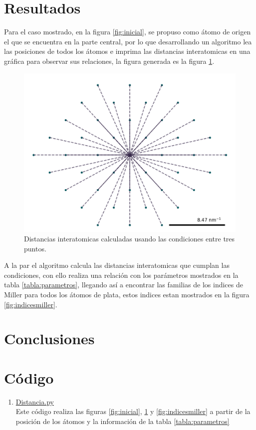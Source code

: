 \documentclass[reprint,amsmath,amssymb,aps,]{revtex4-2}
\begin{document}
\section{Resultados}
Para el caso mostrado, en la figura \ref{fig:inicial}, se propuso como átomo de origen el que se encuentra en la parte central, por lo que
desarrollando un algoritmo lea las posiciones de todos los átomos e imprima las distancias interatomicas en una gráfica para observar sus relaciones,
la figura generada es la figura \ref{fig:distancias}.
\begin{figure}[H]
    \centering
    \includegraphics[scale=0.4]{../Graphics/distancia.png}
    \caption{Distancias interatomicas calculadas usando las condiciones entre tres puntos.}
    \label{fig:distancias}
\end{figure}
A la par el algoritmo calcula las distancias interatomicas que cumplan las condiciones, con ello realiza una relación con los parámetros mostrados en la tabla \ref{tabla:parametros},
llegando así a encontrar las familias de los indices de Miller para todos los átomos de plata, estos indices estan mostrados en la 
figura \ref{fig:indicesmiller}.
\section{Conclusiones}
\section{Código}
\begin{enumerate}
    \item \href{https://github.com/giovannilopez9808/Notas_Agosto_2020/blob/master/AMC/Tarea2/distancia.py}{Distancia.py\label{cod:distancias}}\\
    Este código realiza las figuras \ref{fig:inicial}, \ref{fig:distancias} y \ref{fig:indicesmiller} a partir de la posición de los átomos y la información de la tabla \ref{tabla:parametros}
\end{enumerate}

\nocite{*}

\end{document}
